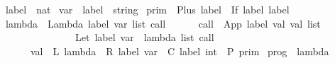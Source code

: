 %
\begin{isabellebody}%
\def\isabellecontext{CPSScheme}%
%
\isamarkuptrue%
\isamarkupfalse%
\ label\ {\isacharequal}\ nat\isanewline
\isanewline
{}\isamarkupfalse%
\ var\ {\isacharequal}\ {\isachardoublequoteopen}label\ {\isasymtimes}\ string{\isachardoublequoteclose}\isanewline
\isanewline
\isamarkuptrue%
\isamarkupfalse%
\ prim\ {\isacharequal}\ Plus\ label\ {\isacharbar}\ If\ label\ label\isanewline
\isanewline
{}\isamarkupfalse%
\ lambda\ {\isacharequal}\ Lambda\ label\ {\isachardoublequoteopen}var\ list{\isachardoublequoteclose}\ call\isanewline
\ \ \ \ \ \ call\ {\isacharequal}\ App\ label\ val\ {\isachardoublequoteopen}val\ list{\isachardoublequoteclose}\isanewline
\ \ \ \ \ \ \ \ \ \ \ \ \ \ {\isacharbar}\ Let\ label\ {\isachardoublequoteopen}{\isacharparenleft}var\ {\isasymtimes}\ lambda{\isacharparenright}\ list{\isachardoublequoteclose}\ call\isanewline
\ \ \ \ \ \ val\ {\isacharequal}\ L\ lambda\ {\isacharbar}\ R\ label\ var\ {\isacharbar}\ C\ label\ int\ {\isacharbar}\ P\ prim\isanewline
\isanewline
{}\isamarkupfalse%
\ prog\ {\isacharequal}\ lambda%
\end{isabellebody}%
